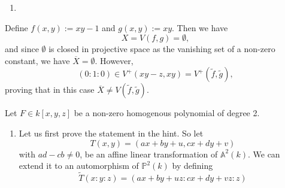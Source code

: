 \begin{exercise}{1}
\begin{enumerate}
        \item{} 
    \end{enumerate}Define $f(x,y):=xy-1$ and $g(x,y):=xy$. Then we have 
    $$X=V(f,g)=\emptyset,$$
    and since $\emptyset$ is closed in projective space as the vanishing 
    set of a non-zero constant, we have $\overline{X}=\emptyset$.
    However, 
    $$
    (0:1:0)\in V^+(xy-z,xy)=V^+(\tilde{f}, \tilde{g}),
    $$
    proving that in this case $\overline{X}\neq V(\tilde{f},\tilde{g})$.
\end{exercise}

\begin{exercise}{2}
    Let $F \in k[x, y, z]$ be a non-zero homogenous polynomial of degree 2.
    \begin{enumerate}
        \item{} Let us first prove the statement in the hint. So let
            \begin{equation*}
                T (x, y) = (a x + b y + u, c x + d y + v)
            \end{equation*}
            with $ad - cb \not= 0$, be an affine linear transformation of
            $\mathbb{A}^2(k)$.
            We can extend it to an automorphism of $\mathbb{P}^2(k)$ by defining
            \begin{equation*}
                \widetilde{T} (x : y : z) = (a x + b y + u z : c x + d y + v z : z)

\end{equation*}
\end{enumerate}
\end{exercise}
